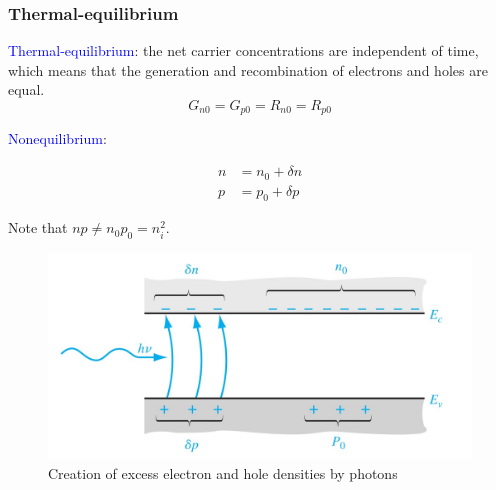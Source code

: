 \documentclass{beamer}
\begin{document}
    \begin{frame} \frametitle{Thermal-equilibrium}
        \textcolor{blue}{Thermal-equilibrium}: the net carrier concentrations are independent of time, which means that the generation and recombination of electrons and holes are equal.
        \begin{equation*}
            G_{n0} = G_{p0} = R_{n0} = R_{p0}
        \end{equation*}

        \textcolor{blue}{Nonequilibrium}: 
        
        \begin{minipage}{\linewidth}
            \begin{minipage}{0.5\linewidth}
                \begin{equation*}
                    \begin{aligned}
                        n &= n_0 + \delta n \\
                        p &= p_0 + \delta p
                    \end{aligned}
                \end{equation*}
                \par Note that $np \neq n_0 p_0 = n_i^2$.
            \end{minipage}
            \begin{minipage}{0.49\linewidth}
                \begin{figure}[H]
                    \centering
                    \includegraphics[width=\linewidth]{Photons-generation.jpg}
                    \caption{Creation of excess electron and hole densities by photons}
                    \label{fig:Photons-generation.jpg}
                \end{figure}
            \end{minipage}
        \end{minipage}
    \end{frame}
\end{document}
